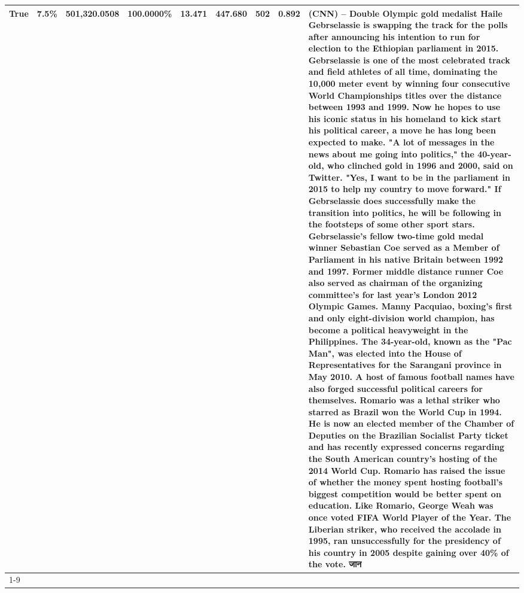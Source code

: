 \begin{table}[H]
{\begin{tabular}{lllrlllll}
True & 7.5\% & 501,320.0508 & \bfseries \color{red} 100.0000\% & 13.471 & 447.680 & 502 & 0.892 & (CNN) -- Double Olympic gold medalist Haile Gebrselassie is swapping the track for the polls after announcing his intention to run for election to the Ethiopian parliament in 2015. Gebrselassie is one of the most celebrated track and field athletes of all time, dominating the 10,000 meter event by winning four consecutive World Championships titles over the distance between 1993 and 1999. Now he hopes to use his iconic status in his homeland to kick start his political career, a move he has long been expected to make. "A lot of messages in the news about me going into politics," the 40-year-old, who clinched gold in 1996 and 2000, said on Twitter. "Yes, I want to be in the parliament in 2015 to help my country to move forward." If Gebrselassie does successfully make the transition into politics, he will be following in the footsteps of some other sport stars. Gebrselassie's fellow two-time gold medal winner Sebastian Coe served as a Member of Parliament in his native Britain between 1992 and 1997. Former middle distance runner Coe also served as chairman of the organizing committee's for last year's London 2012 Olympic Games. Manny Pacquiao, boxing's first and only eight-division world champion, has become a political heavyweight in the Philippines. The 34-year-old, known as the "Pac Man", was elected into the House of Representatives for the Sarangani province in May 2010. A host of famous football names have also forged successful political careers for themselves. Romario was a lethal striker who starred as Brazil won the World Cup in 1994. He is now an elected member of the Chamber of Deputies on the Brazilian Socialist Party ticket and has recently expressed concerns regarding the South American country's hosting of the 2014 World Cup. Romario has raised the issue of whether the money spent hosting football's biggest competition would be better spent on education. Like Romario, George Weah was once voted FIFA World Player of the Year. The Liberian striker, who received the accolade in 1995, ran unsuccessfully for the presidency of his country in 2005 despite gaining over 40\% of the vote. जान \\
\cline{1-9}

\end{tabular}}
\end{table}
